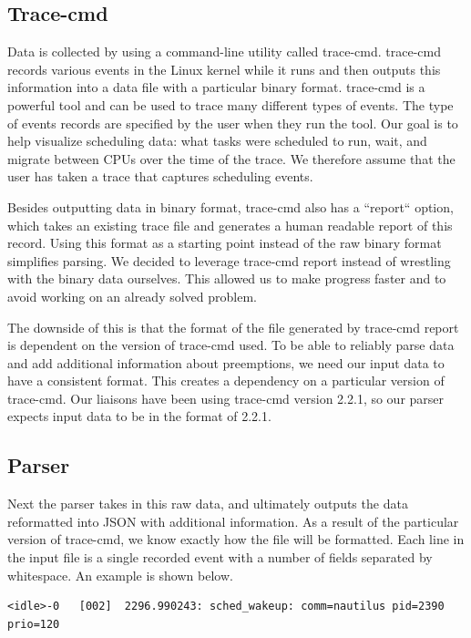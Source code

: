 \documentclass{hmcclinic}
\begin{document}
  \subsection{Trace-cmd}

  Data is collected by using a command-line utility called trace-cmd.
  trace-cmd records various events in the Linux kernel while it runs and then
  outputs this information into a data file with a particular binary format.
  trace-cmd is a powerful tool and can be used to trace many different types of
  events. The type of events records are specified by the user when they run
  the tool. Our goal is to help visualize scheduling data: what tasks were
  scheduled to run, wait, and migrate between CPUs over the time of the trace.
  We therefore assume that the user has taken a trace that captures scheduling
  events.

  Besides outputting data in binary format, trace-cmd also has a ``report``
  option, which takes an existing trace file and generates a human readable
  report of this record. Using this format as a starting point instead of the
  raw binary format simplifies parsing.  We decided to leverage trace-cmd report
  instead of wrestling with the binary data ourselves. This allowed us to make
  progress faster and to avoid working on an already solved problem.

  The downside of this is that the format of the file generated by trace-cmd
  report is dependent on the version of trace-cmd used. To be able to reliably
  parse data and add additional information about preemptions, we need our input
  data to have a consistent format. This creates a dependency on a particular
  version of trace-cmd. Our liaisons have been using trace-cmd version 2.2.1, so
  our parser expects input data to be in the format of 2.2.1.

  \subsection{Parser}
  Next the parser takes in this raw data, and ultimately outputs the data
  reformatted into JSON with additional information. As a result of the
  particular version of trace-cmd, we know exactly how the file will be
  formatted. Each line in the input file is a single recorded event with a
  number of fields separated by whitespace. An example is shown below.
   
\footnotesize\begin{verbatim}<idle>-0   [002]  2296.990243: sched_wakeup: comm=nautilus pid=2390 prio=120\end{verbatim}
  
\end{document}
